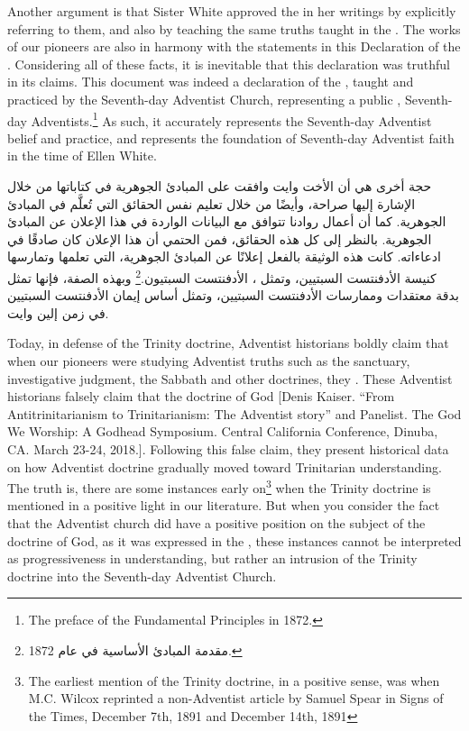 Another argument is that Sister White approved the  in her writings by explicitly referring to them, and also by teaching the same truths taught in the . The works of our pioneers are also in harmony with the statements in this Declaration of the . Considering all of these facts, it is inevitable that this declaration was truthful in its claims. This document was indeed a declaration of the , taught and practiced by the Seventh-day Adventist Church, representing a public ,  Seventh-day Adventists.\footnote{The preface of the Fundamental Principles in 1872.} As such, it accurately represents the Seventh-day Adventist belief and practice, and represents the foundation of Seventh-day Adventist faith in the time of Ellen White.


حجة أخرى هي أن الأخت وايت وافقت على المبادئ الجوهرية في كتاباتها من خلال الإشارة إليها صراحة، وأيضًا من خلال تعليم نفس الحقائق التي تُعلَّم في المبادئ الجوهرية. كما أن أعمال روادنا تتوافق مع البيانات الواردة في هذا الإعلان عن المبادئ الجوهرية. بالنظر إلى كل هذه الحقائق، فمن الحتمي أن هذا الإعلان كان صادقًا في ادعاءاته. كانت هذه الوثيقة بالفعل إعلانًا عن المبادئ الجوهرية، التي تعلمها وتمارسها كنيسة الأدفنتست السبتيين، وتمثل ،  الأدفنتست السبتيون.\footnote{مقدمة المبادئ الأساسية في عام 1872.} وبهذه الصفة، فإنها تمثل بدقة معتقدات وممارسات الأدفنتست السبتيين، وتمثل أساس إيمان الأدفنتست السبتيين في زمن إلين وايت.


Today, in defense of the Trinity doctrine, Adventist historians boldly claim that when our pioneers were studying Adventist truths such as the sanctuary, investigative judgment, the Sabbath and other doctrines, they . These Adventist historians falsely claim that the doctrine of God [Denis Kaiser. “From Antitrinitarianism to Trinitarianism: The Adventist story” and Panelist. The God We Worship: A Godhead Symposium. Central California Conference, Dinuba, CA. March 23-24, 2018.]. Following this false claim, they present historical data on how Adventist doctrine gradually moved toward Trinitarian understanding. The truth is, there are some instances early on\footnote{The earliest mention of the Trinity doctrine, in a positive sense, was when M.C. Wilcox reprinted a non-Adventist article by Samuel Spear in Signs of the Times, December 7th, 1891 and December 14th, 1891} when the Trinity doctrine is mentioned in a positive light in our literature. But when you consider the fact that the Adventist church did have a positive position on the subject of the doctrine of God, as it was expressed in the , these instances cannot be interpreted as progressiveness in understanding, but rather an intrusion of the Trinity doctrine into the Seventh-day Adventist Church.


